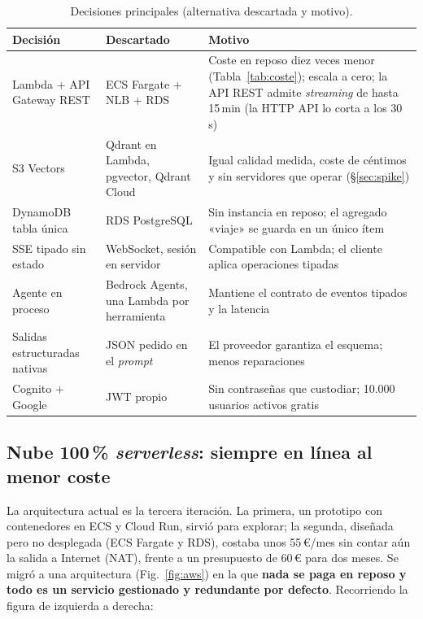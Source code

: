\begin{table}[t]
\centering\scriptsize
\caption{Decisiones principales (alternativa descartada y motivo).}\label{tab:decisiones}
\begin{tabularx}{\columnwidth}{@{}L{1.75cm}L{1.9cm}Y@{}}
\toprule
\textbf{Decisión} & \textbf{Descartado} & \textbf{Motivo} \\
\midrule
Lambda + API Gateway REST & ECS Fargate + NLB + RDS & Coste en reposo diez veces menor (Tabla~\ref{tab:coste}); escala a cero; la API REST admite \emph{streaming} de hasta 15\,min (la HTTP API lo corta a los 30\,s) \\
S3 Vectors & Qdrant en Lambda, pgvector, Qdrant Cloud & Igual calidad medida, coste de céntimos y sin servidores que operar (§\ref{sec:spike}) \\
DynamoDB tabla única & RDS PostgreSQL & Sin instancia en reposo; el agregado «viaje» se guarda en un único ítem \\
SSE tipado sin estado & WebSocket, sesión en servidor & Compatible con Lambda; el cliente aplica operaciones tipadas \\
Agente en proceso & Bedrock Agents, una Lambda por herramienta & Mantiene el contrato de eventos tipados y la latencia \\
Salidas estructuradas nativas & JSON pedido en el \emph{prompt} & El proveedor garantiza el esquema; menos reparaciones \\
Cognito + Google & JWT propio & Sin contraseñas que custodiar; 10.000 usuarios activos gratis \\
\bottomrule
\end{tabularx}
\end{table}

\subsection{Nube 100\,\% \emph{serverless}: siempre en línea al menor coste}\label{sec:coste}

La arquitectura actual es la tercera iteración. La primera, un prototipo con contenedores en ECS y
Cloud Run, sirvió para explorar; la segunda, diseñada pero no desplegada (ECS Fargate y RDS),
costaba unos 55\,€/mes sin contar aún la salida a Internet (NAT), frente a un presupuesto de 60\,€
para dos meses. Se migró a una arquitectura (Fig.~\ref{fig:aws}) en la que \textbf{nada se paga
en reposo y todo es un servicio gestionado y redundante por defecto}. Recorriendo la figura de
izquierda a derecha:


